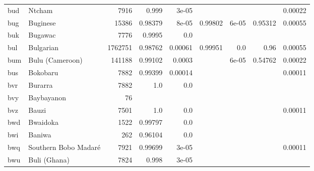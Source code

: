 \documentclass[11pt]{article}
\begin{document}
\begin{table*}[h]
{\begin{tabular}{llrrrrrrr}
bud         & Ntcham         & 7916         & 0.999         & 3e-05         &          &          &          & 0.00022         \\

bug         & Buginese         & 15386         & 0.98379         & 8e-05         & 0.99802         & 6e-05         & 0.95312         & 0.00055         \\

buk         & Bugawac         & 7776         & 0.9995         & 0.0         &          &          &          &          \\

bul         & Bulgarian         & 1762751         & 0.98762         & 0.00061         & 0.99951         & 0.0         & 0.96         & 0.00055         \\

bum         & Bulu (Cameroon)         & 141188         & 0.99102         & 0.0003         &          & 6e-05         & 0.54762         & 0.00022         \\

bus         & Bokobaru         & 7882         & 0.99399         & 0.00014         &          &          &          & 0.00011         \\

bvr         & Burarra         & 7882         & 1.0         & 0.0         &          &          &          &          \\

bvy         & Baybayanon         & 76         &          &          &          &          &          &          \\

bvz         & Bauzi         & 7501         & 1.0         & 0.0         &          &          &          & 0.00011         \\

bwd         & Bwaidoka         & 1522         & 0.99797         & 0.0         &          &          &          &          \\

bwi         & Baniwa         & 262         & 0.96104         & 0.0         &          &          &          &          \\

bwq         & Southern Bobo Madaré         & 7921         & 0.99699         & 3e-05         &          &          &          & 0.00011         \\

bwu         & Buli (Ghana)         & 7824         & 0.998         & 3e-05         &          &          &          &          \\


\end{tabular}}
\end{table*}
\end{document}
